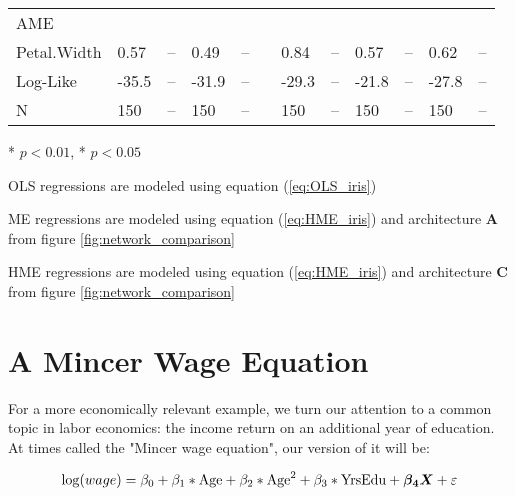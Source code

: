 \documentclass[12pt]{article}
\begin{document}
\begin{landscape}
\begin{table}
\begin{threeparttable}
\begin{tabular}[l]{l l l l l l l l l l l l}
  AME \\
  \cmidrule(r){1-1}
  Petal.Width        & 0.57 & --     & 0.49 & --     && 0.84  & --     & 0.57 & --     & 0.62 & --         \\[0.3cm]


  Log-Like           & -35.5 & --    & -31.9 & --    && -29.3  & --    & -21.8& --     & -27.8 & -- \\
  N                  & 150   & --    & 150   & --    && 150    & --    & 150  & --     & 150   & -- \\

	\hline
		\end{tabular}
		\begin{tablenotes}
			\item{\footnotesize ** $p < 0.01$, * $p < 0.05$}
			\item{\footnotesize OLS regressions are modeled using equation (\ref{eq:OLS_iris})}
			\item{\footnotesize ME regressions are modeled using equation (\ref{eq:HME_iris}) and architecture $\boldsymbol{A}$ from figure \ref{fig:network_comparison}}
			\item{\footnotesize HME regressions are modeled using equation (\ref{eq:HME_iris}) and architecture $\boldsymbol{C}$ from figure \ref{fig:network_comparison}}
		\end{tablenotes} \label{tbl:Iris}
	\end{threeparttable}
\end{table}
\end{landscape}




\section{A Mincer Wage Equation} \label{sec:MincerWageEx}

For a more economically relevant example, we turn our attention to a common
topic in labor economics: the income return on an additional year of
education. At times called the "Mincer wage equation", our version of it
will be:

\begin{equation} \label{eq:mincer_equ}
  \log (wage) = \beta_{0} + \beta_{1} * \textnormal{Age} + \beta_{2} * \textnormal{Age}^{2} + \beta_{3} * \textnormal{YrsEdu} + \boldsymbol{\beta_{4}}\boldsymbol{X} + \varepsilon
\end{equation}
\end{document}
